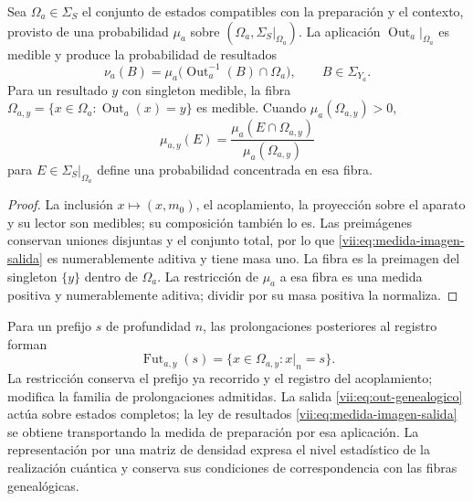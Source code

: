 \begin{proposition}
\label{vii:prop:medida-salida}
Sea \(\Omega_a\in\Sigma_S\) el conjunto de estados compatibles con la
preparación y el contexto, provisto de una probabilidad \(\mu_a\) sobre
\((\Omega_a,\Sigma_S|_{\Omega_a})\).
La aplicación \(\operatorname{Out}_a|_{\Omega_a}\) es medible y produce
la probabilidad de resultados
\begin{equation}
 \nu_a(B)=\mu_a\bigl(\operatorname{Out}_a^{-1}(B)\cap\Omega_a\bigr),
 \qquad B\in\Sigma_{Y_a}.
 \label{vii:eq:medida-imagen-salida}
\end{equation}
Para un resultado \(y\) con singleton medible, la fibra
\(\Omega_{a,y}=\{x\in\Omega_a:\operatorname{Out}_a(x)=y\}\)
es medible. Cuando \(\mu_a(\Omega_{a,y})>0\),
\begin{equation}
 \mu_{a,y}(E)=
 \frac{\mu_a(E\cap\Omega_{a,y})}{\mu_a(\Omega_{a,y})}
 \label{vii:eq:condicionamiento-salida}
\end{equation}
para \(E\in\Sigma_S|_{\Omega_a}\) define una probabilidad concentrada
en esa fibra.
\end{proposition}
\begin{proof}
La inclusión \(x\mapsto(x,m_0)\), el acoplamiento, la proyección sobre
el aparato y su lector son medibles; su composición también lo es.
Las preimágenes conservan uniones disjuntas y el conjunto total, por lo
que \eqref{vii:eq:medida-imagen-salida} es numerablemente aditiva y tiene
masa uno. La fibra es la preimagen del singleton \(\{y\}\) dentro de
\(\Omega_a\). La restricción de \(\mu_a\) a esa fibra es una medida
positiva y numerablemente aditiva; dividir por su masa positiva la normaliza.
\end{proof}

Para un prefijo \(s\) de profundidad \(n\), las prolongaciones posteriores
al registro forman
\[
 \operatorname{Fut}_{a,y}(s)
 =\{x\in\Omega_{a,y}:x|_n=s\}.
\]
La restricción conserva el prefijo ya recorrido y el registro del
acoplamiento; modifica la familia de prolongaciones admitidas. La salida
\eqref{vii:eq:out-genealogico} actúa sobre estados completos; la ley de
resultados \eqref{vii:eq:medida-imagen-salida} se obtiene transportando
la medida de preparación por esa aplicación. La representación por una
matriz de densidad expresa el nivel
estadístico de la realización cuántica y conserva sus condiciones de
correspondencia con las fibras genealógicas.
